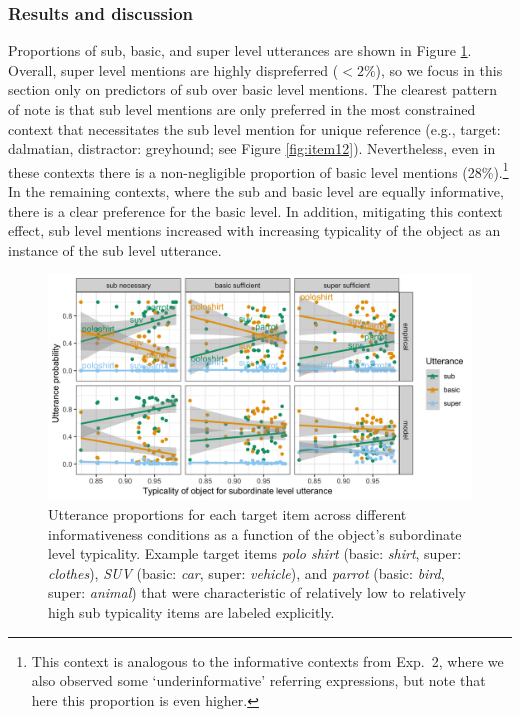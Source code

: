 \documentclass[11pt]{article}
\newcommand{\figref}[1]{Figure \ref{#1}}
\begin{document}
\subsubsection{Results and discussion}


Proportions of sub, basic, and super level utterances are shown in \figref{fig:exp3results}. Overall, super level mentions are highly dispreferred ($< 2\%$), so we focus in this section only on predictors of sub over basic level mentions. The clearest pattern of note is that sub level mentions are only preferred in the most constrained context that necessitates the sub level mention for unique reference (e.g., target: dalmatian, distractor: greyhound; see \figref{fig:item12}). Nevertheless, even in these contexts there is a non-negligible proportion of basic level mentions (28\%).\footnote{This context is analogous to the informative contexts from Exp.~2, where we also observed some `underinformative' referring expressions, but note that here this proportion is even higher.} In the remaining contexts, where the sub and basic level are equally informative, there is a clear preference for the basic level. In addition, mitigating this context effect, sub level mentions increased with increasing typicality of the object as an instance of the sub level utterance.


\begin{figure}
\centering
\includegraphics[width=.9\textwidth]{pics/results-exp3.png}
\caption{Utterance proportions for each target item across different informativeness conditions as a function of the object's subordinate level typicality. Example target items \emph{polo shirt} (basic: \emph{shirt}, super: \emph{clothes}),  \emph{SUV} (basic: \emph{car}, super: \emph{vehicle}), and \emph{parrot} (basic: \emph{bird}, super: \emph{animal}) that were characteristic of relatively low to relatively high sub typicality items are labeled explicitly.}
\label{fig:exp3results}
\end{figure}
\end{document}
